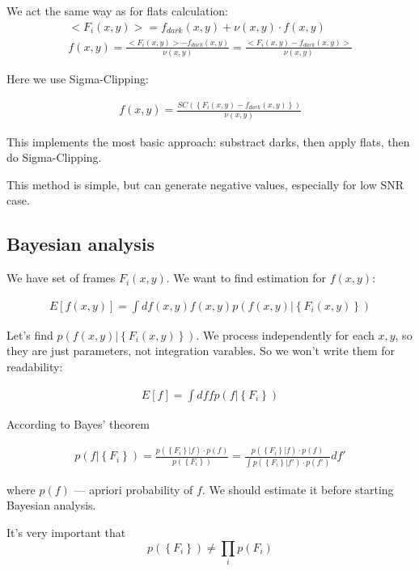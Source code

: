 \documentclass{article}
\begin{document}
We act the same way as for flats calculation:
\begin{eqnarray}
    <F_i(x,y)> = f_{dark}(x,y) + \nu(x,y) \cdot f(x,y) \\
    f(x,y) = \frac{<F_i(x,y)> - f_{dark}(x,y)}{\nu(x,y)} = \frac{<F_i(x,y) - f_{dark}(x,y)>}{\nu(x,y)}
\end{eqnarray}

Here we use Sigma-Clipping:

\begin{eqnarray}
    f(x,y) = \frac{SC(\left\{ F_i(x,y) - f_{dark}(x,y)\right\})}{\nu(x,y)}
\end{eqnarray}

This implements the most basic approach: substract darks, then apply flats, then do Sigma-Clipping.

This method is simple, but can generate negative values, especially for low SNR case.

\subsection{Bayesian analysis}

We have set of frames $F_i(x,y)$. We want to find estimation for $f(x,y)$:

\begin{eqnarray}
    E\left[ f(x,y) \right] = \int df(x,y) f(x,y) p(f(x,y) | \left\{ F_i(x,y) \right\})
\end{eqnarray}

Let's find $p(f(x,y) | \left\{ F_i(x,y) \right\})$. We process independently for each $x,y$, so they are just parameters,
not integration varables. So we won't write them for readability:

\begin{eqnarray}
    E\left[ f \right] = \int df f p(f | \left\{ F_i \right\})
\end{eqnarray}

According to Bayes' theorem

\begin{eqnarray}
    p(f | \left\{ F_i \right\}) = \frac{p(\left\{ F_i \right\} | f) \cdot p(f)}{p(\left\{ F_i \right\})} =
    \frac{p(\left\{ F_i \right\} | f) \cdot p(f)}{\int p(\left\{ F_i \right\} | f') \cdot p(f')} df' \label{eq:bayes}
\end{eqnarray}

where $p(f)$ --- apriori probability of $f$. We should estimate it before starting Bayesian analysis.

It's very important that
\begin{equation}
    p(\left\{ F_i \right\}) \ne \prod_i p(F_i)
\end{equation}
\end{document}
